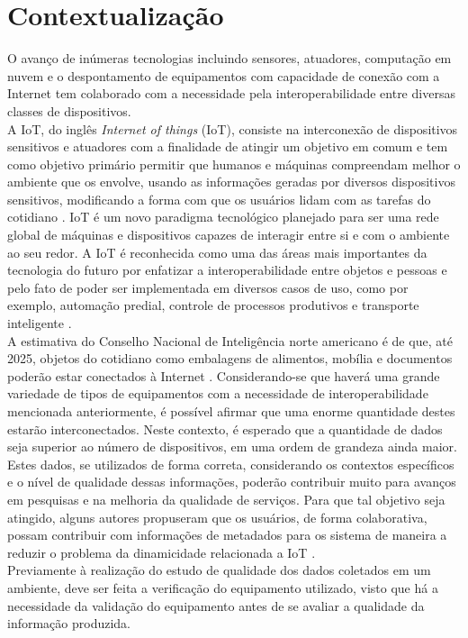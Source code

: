 \section{Contextualização}
\quad
O avanço de inúmeras tecnologias incluindo sensores, atuadores, computação em nuvem e o despontamento de equipamentos com capacidade de conexão com a Internet tem colaborado com a necessidade pela interoperabilidade entre diversas classes de dispositivos.
\\ \null
\quad
A \acrlong{IoT}, do inglês \textit{Internet of things} (\acrshort{IoT}), consiste na interconexão de dispositivos sensitivos e atuadores com a finalidade de atingir um objetivo em comum \cite{giusto} e tem como objetivo primário %
permitir que humanos e máquinas compreendam melhor o ambiente que os envolve, usando as informações geradas por
diversos dispositivos sensitivos, modificando a forma com que os usuários lidam com as tarefas do cotidiano \cite{IOTS}. \acrshort{IoT} é um novo paradigma tecnológico planejado para ser uma rede
global de máquinas e dispositivos capazes de interagir entre si e com o ambiente ao seu redor.
A \acrshort{IoT} é reconhecida como uma das áreas mais importantes da tecnologia do futuro por enfatizar a interoperabilidade entre objetos e pessoas e pelo fato de
poder ser implementada em diversos casos de uso, como por exemplo, automação predial, controle de processos produtivos e transporte inteligente \cite{IOTV}.
\\ \null
\quad A estimativa do Conselho Nacional de Inteligência norte americano é de que, até 2025, objetos do cotidiano como embalagens de alimentos, mobília e documentos
poderão estar conectados à Internet \cite{intelsix}. Considerando-se que haverá uma grande variedade de tipos de equipamentos com a necessidade de interoperabilidade mencionada anteriormente,
é possível afirmar que uma enorme quantidade destes estarão interconectados. Neste contexto,
é esperado que a quantidade de dados seja superior ao número de dispositivos, em uma ordem de grandeza ainda maior.
\\ \null
\quad Estes dados, se utilizados de forma correta, considerando os contextos específicos e o nível de qualidade dessas informações, poderão contribuir muito para avanços em pesquisas e na melhoria da qualidade de serviços. Para que tal objetivo seja atingido, alguns autores propuseram que os usuários, de forma colaborativa, possam contribuir com informações de metadados para os sistema de maneira a reduzir o problema da dinamicidade relacionada a \acrshort{IoT} \cite{collaborative}.
\\ \null \quad Previamente à realização do estudo de qualidade dos dados coletados em um ambiente, deve ser feita a verificação do equipamento utilizado, visto que há a necessidade da validação do equipamento antes de se avaliar a qualidade da informação produzida.
